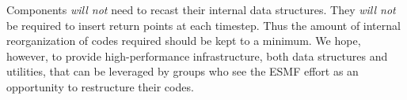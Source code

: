 Components {\it will not} need to recast their internal data structures.
They {\it will not} be required to insert return points at each timestep.
Thus the amount of internal reorganization of codes required should be 
kept to a minimum.  We hope, however, to provide high-performance infrastructure,
both data structures and utilities, that can be leveraged by groups who see
the ESMF effort as an opportunity to restructure their codes.



